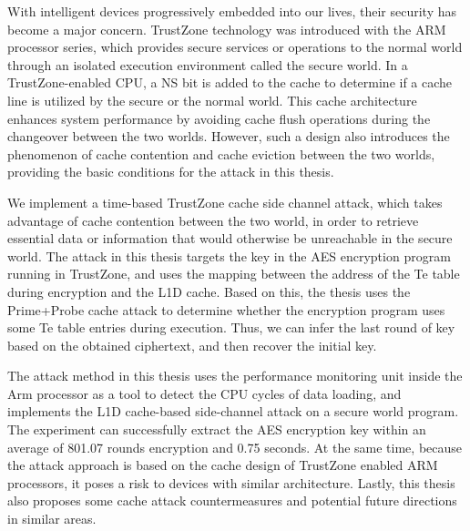 \begin{enabstract}
With intelligent devices progressively embedded into our lives, their security has become a major concern. TrustZone technology was introduced with the ARM processor series, which provides secure services or operations to the normal world through an isolated execution environment called the secure world. In a TrustZone-enabled CPU, a NS bit is added to the cache to determine if a cache line is utilized by the secure or the normal world. This cache architecture enhances system performance by avoiding cache flush operations during the changeover between the two worlds. However, such a design also introduces the phenomenon of cache contention and cache eviction between the two worlds, providing the basic conditions for the attack in this thesis.

We implement a time-based TrustZone cache side channel attack, which takes advantage of cache contention between the two world, in order to retrieve essential data or information that would otherwise be unreachable in the secure world. The attack in this thesis targets the key in the AES encryption program running in TrustZone, and uses the mapping between the address of the Te table during encryption and the L1D cache. Based on this, the thesis uses the Prime+Probe cache attack to determine whether the encryption program uses some Te table entries during execution. Thus, we can infer the last round of key based on the obtained ciphertext, and then recover the initial key. 

The attack method in this thesis uses the performance monitoring unit inside the Arm processor as a tool to detect the CPU cycles of data loading, and implements the L1D cache-based side-channel attack on a secure world program. The experiment can successfully extract the AES encryption key within an average of 801.07 rounds encryption and 0.75 seconds. At the same time, because the attack approach is based on the cache design of TrustZone enabled ARM processors, it poses a risk to devices with similar architecture. Lastly, this thesis also proposes some cache attack countermeasures and potential future directions in similar areas.

\end{enabstract}
